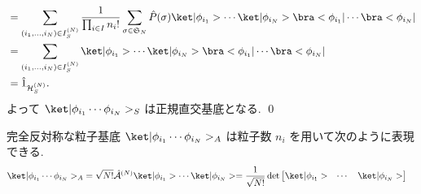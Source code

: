 \documentclass[uplatex,dvipdfmx,a4paper,11pt]{jlreq}
\makeatletter
\newcommand{\HH}{\mathcal{H}}
\renewcommand{\SS}{\mathfrak{S}}
\newcommand{\A}{\mathcal{A}}
\numberwithin{equation}{section}
\theoremstyle{definition}
\renewenvironment{proof}[1][\proofname]{\par
  \normalfont
  \topsep6\p@\@plus6\p@ \trivlist
  \item[\hskip\labelsep{\bfseries #1}\@addpunct{\bfseries}]\ignorespaces\quad\par
}{%
  \qed\endtrivlist\@endpefalse
}
\renewcommand\proofname{証明}
\makeatother
\begin{document}
\begin{proof}
\begin{align}
     & = \sum_{(i_1,\ldots,i_N)\in I_S^{(N)}}\frac{1}{\prod_{i\in I}n_i!}\sum_{\sigma\in\SS_N}\hat{P}(\sigma)\ket|\phi_{i_1}>\cdots\ket|\phi_{i_N}>\bra<\phi_{i_1}|\cdots\bra<\phi_{i_N}|                                           \\
     & = \sum_{(i_1,\ldots,i_N)\in I_S^{(N)}}\ket|\phi_{i_1}>\cdots\ket|\phi_{i_N}>\bra<\phi_{i_1}|\cdots\bra<\phi_{i_N}|                                                                                                           \\
     & = \hat{1}_{\HH_S^{(N)}}.
  \end{align}
  よって $\ket|\phi_{i_1}\cdots\phi_{i_N}>_S$ は正規直交基底となる.
\end{proof}

\begin{theorem}[Q21-19(ii), Q21-21(i)(ii)]
  完全反対称な粒子基底 $\ket|\phi_{i_1}\cdots\phi_{i_N}>_A$ は粒子数 $n_i$ を用いて次のように表現できる.
  \begin{align}
    \ket|\phi_{i_1}\cdots\phi_{i_N}>_A & = \sqrt{N!}\hat{\A}^{(N)}\ket|\phi_{i_1}>\cdots\ket|\phi_{i_N}> = \frac{1}{\sqrt{N!}}\det\begin{bmatrix}\ket|\phi_{i_1}> & \cdots & \ket|\phi_{i_N}>\end{bmatrix}
  \end{align}
\end{theorem}
\end{document}
